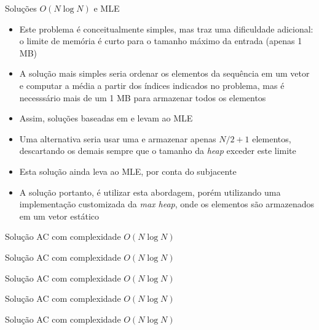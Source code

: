\begin{frame}[fragile]{Soluções $O(N\log N)$ e MLE}

    \begin{itemize}
        \item Este problema é conceitualmente simples, mas traz uma dificuldade adicional:
            o limite de memória é curto para o tamanho máximo da entrada (apenas 1 MB)

        \item A solução mais simples seria ordenar os elementos da sequência em um vetor e
            computar a média a partir dos índices indicados no problema, mas é necesssário mais
            de um 1 MB para armazenar todos os elementos

        \item Assim, soluções baseadas em  e  levam ao 
            MLE

        \item Uma alternativa seria usar uma  e armazenar apenas
            $N/2 + 1$ elementos, descartando os demais sempre que o tamanho da \textit{heap}
            exceder este limite

        \item Esta solução ainda leva ao MLE, por conta do  subjacente

        \item A solução portanto, é utilizar esta abordagem, porém utilizando uma implementação
            customizada da \textit{max heap}, onde os elementos são armazenados em um vetor
            estático
   \end{itemize}

\end{frame}

\begin{frame}[fragile]{Solução AC com complexidade $O(N\log N)$}
\end{frame}

\begin{frame}[fragile]{Solução AC com complexidade $O(N\log N)$}
\end{frame}

\begin{frame}[fragile]{Solução AC com complexidade $O(N\log N)$}
\end{frame}

\begin{frame}[fragile]{Solução AC com complexidade $O(N\log N)$}
\end{frame}

\begin{frame}[fragile]{Solução AC com complexidade $O(N\log N)$}
\end{frame}
